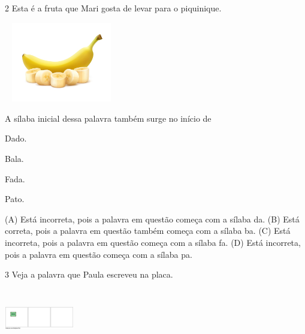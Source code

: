 \num{2} Esta é a fruta que Mari gosta de levar para o piquinique.

\includegraphics[width=1.96704in,height=1.37153in]{media/image175.jpeg}


A sílaba inicial dessa palavra também surge no início de

\begin{minipage}{.5\textwidth}
\begin{escolha}
\item Dado.

\item Bala.

\item Fada.

\item Pato.
\end{escolha}
\end{minipage}

(A) Está incorreta, pois a palavra em questão começa com a sílaba da.
(B) Está correta, pois a palavra em questão também começa com a sílaba ba.
(C) Está incorreta, pois a palavra em questão começa com a sílaba fa.
(D) Está incorreta, pois a palavra em questão começa com a sílaba pa.

\num{3} Veja a palavra que Paula escreveu na placa.

\includegraphics[width=1.19861in,height=1.00625in]{media/image176.png}

